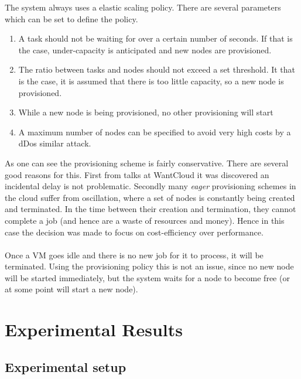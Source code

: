 \documentclass[a4paper]{IEEEtran}
\begin{document}
The system always uses a elastic scaling policy. There are several parameters which can be set to define the policy.

\begin{enumerate}
\item A task should not be waiting for over a certain number of seconds.
If that is the case, under-capacity is anticipated and new nodes are provisioned.
\item The ratio between tasks and nodes should not exceed a set threshold. It that is the case, it is assumed that there is too little capacity, so a new node is provisioned.
\item While a new node is being provisioned, no other provisioning will start
\item A maximum number of nodes can be specified to avoid very high costs by a dDos similar attack.
\end{enumerate}

As one can see the provisioning scheme is fairly conservative.
There are several good reasons for this.
First from talks at WantCloud it was discovered an incidental delay is not problematic.
Secondly many \textit{eager} provisioning schemes in the cloud suffer from oscillation, where a set of nodes is constantly being created and terminated.
In the time between their creation and termination, they cannot complete a job (and hence are a waste of resources and money).
Hence in this case the decision was made to focus on cost-efficiency over performance.
\\
\\
Once a VM goes idle and there is no new job for it to process, it will be terminated.
Using the provisioning policy this is not an issue, since no new node will be started immediately, but the system waits for a node to become free (or at some point will start a new node).

\section{Experimental Results}

\subsection{Experimental setup}


\end{document}
